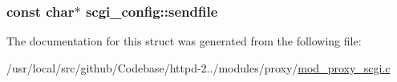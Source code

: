 \subsubsection[{\texorpdfstring{sendfile}{sendfile}}]{\setlength{\rightskip}{0pt plus 5cm}const char$\ast$ scgi\+\_\+config\+::sendfile}\hypertarget{structscgi__config_a9d6141c0d3f8b85abcc2eafd61a65479}{}\label{structscgi__config_a9d6141c0d3f8b85abcc2eafd61a65479}


The documentation for this struct was generated from the following file\+:\begin{DoxyCompactItemize}
\item 
/usr/local/src/github/\+Codebase/httpd-\/2../modules/proxy/\hyperlink{mod__proxy__scgi_8c}{mod\+\_\+proxy\+\_\+scgi.\+c}\end{DoxyCompactItemize}
